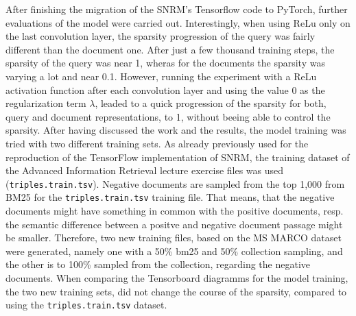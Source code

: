 After finishing the migration of the SNRM's Tensorflow code to PyTorch,
    further evaluations of the model were carried out.
Interestingly, when using ReLu only on the last convolution layer,
    the sparsity progression of the query was fairly different than the document one.
After just a few thousand training steps, the sparsity of the query was near 1,
    wheras for the documents the sparsity was varying a lot and near 0.1.
However, running the experiment with a ReLu activation function after each convolution layer
    and using the value 0 as the regularization term $\lambda$, leaded to a
    quick progression of the sparsity for both, query and document representations, to 1,
    without beeing able to control the sparsity.
After having discussed the work and the results, the model training was tried with two different
    training sets.
As already previously used for the reproduction of the TensorFlow implementation of SNRM, the training 
    dataset of the Advanced Information Retrieval lecture exercise files was used (\texttt{triples.train.tsv}).
Negative documents are sampled from the top 1,000 from BM25 for the \texttt{triples.train.tsv} training file.
That means, that the negative documents might have something in common with the positive documents,
    resp. the semantic difference between a positve and negative document passage might be smaller.
    Therefore, two new training files, based on the MS MARCO dataset were generated, namely 
    one with a 50\% bm25 and 50\% collection sampling, and the other is to 100\% sampled from the collection,
    regarding the negative documents.
When comparing the Tensorboard diagramms for the model training, the two new training sets,
    did not change the course of the sparsity, compared to using the \texttt{triples.train.tsv} dataset.

